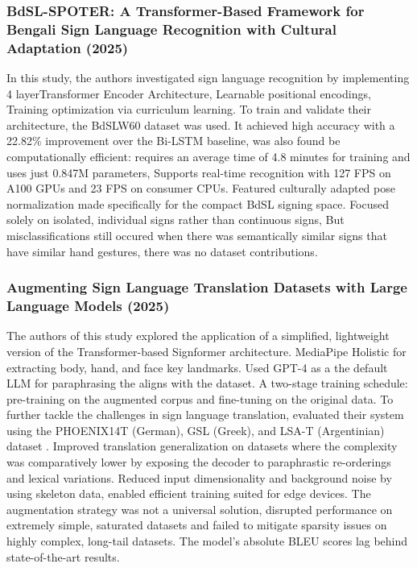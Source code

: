 \subsubsection{BdSL-SPOTER: A Transformer-Based Framework for Bengali Sign Language Recognition with Cultural Adaptation (2025)}
In this study, the authors investigated sign language recognition by implementing 4 layerTransformer Encoder Architecture, Learnable positional encodings, Training optimization via curriculum learning. To train and validate their architecture, the BdSLW60 dataset was used. It achieved high accuracy with a 22.82\% improvement over the Bi-LSTM baseline, was also found be computationally efficient: requires an average time of 4.8 minutes for training and uses just 0.847M parameters, Supports real-time recognition with 127 FPS on A100 GPUs and 23 FPS on consumer CPUs. Featured culturally adapted pose normalization made specifically for the compact BdSL signing space. Focused solely on isolated, individual signs rather than continuous signs, But misclassifications still occured when there was semantically similar signs that have similar hand gestures, there was no dataset contributions.\cite{study_bdsl_spoter_2025}

\subsubsection{Augmenting Sign Language Translation Datasets with Large Language Models (2025)}
The authors of this study explored the application of a simplified, lightweight version of the Transformer-based Signformer architecture. MediaPipe Holistic for extracting body, hand, and face key landmarks. Used GPT-4 as a the default LLM for paraphrasing the aligns with the dataset. A two-stage training schedule: pre-training on the augmented corpus and fine-tuning on the original data. To further tackle the challenges in sign language translation, evaluated their system using the PHOENIX14T (German), GSL (Greek), and LSA-T (Argentinian) dataset \cite{125}. Improved translation generalization on datasets where the complexity was comparatively lower by exposing the decoder to paraphrastic re-orderings and lexical variations. Reduced input dimensionality and background noise by using skeleton data, enabled efficient training suited for edge devices. The augmentation strategy was not a universal solution, disrupted performance on extremely simple, saturated datasets and failed to mitigate sparsity issues on highly complex, long-tail datasets. The model's absolute BLEU scores lag behind state-of-the-art results. \cite{study_augmenting_llm_2025}

